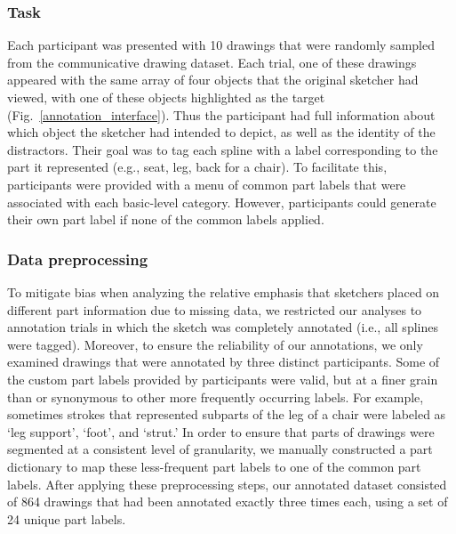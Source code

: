 \documentclass[10pt,letterpaper]{article}
\begin{document}
\subsubsection{Task}
Each participant was presented with 10 drawings that were randomly sampled from the communicative drawing dataset. 
Each trial, one of these drawings appeared with the same array of four objects that the original sketcher had viewed, with one of these objects highlighted as the target (Fig.~\ref{annotation_interface}). 
Thus the participant had full information about which object the sketcher had intended to depict, as well as the identity of the distractors. 
Their goal was to tag each spline with a label corresponding to the part it represented (e.g., seat, leg, back for a chair).  
To facilitate this, participants were provided with a menu of common part labels that were associated with each basic-level category.
However, participants could generate their own part label if none of the common labels applied.

\subsubsection{Data preprocessing}

To mitigate bias when analyzing the relative emphasis that sketchers placed on different part information due to missing data, we restricted our analyses to annotation trials in which the sketch was completely annotated (i.e., all splines were tagged). 
Moreover, to ensure the reliability of our annotations, we only examined drawings that were annotated by three distinct participants. 
Some of the custom part labels provided by participants were valid, but at a finer grain than or synonymous to other more frequently occurring labels. 
For example, sometimes strokes that represented subparts of the leg of a chair were labeled as `leg support', `foot', and `strut.'
In order to ensure that parts of drawings were segmented at a consistent level of granularity, we manually constructed a part dictionary to map these less-frequent part labels to one of the common part labels. 
After applying these preprocessing steps, our annotated dataset consisted of 864 drawings that had been annotated exactly three times each, using a set of 24 unique part labels. 
\end{document}
